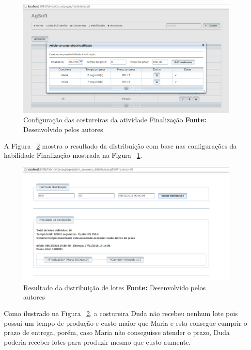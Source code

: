 \newpage

\begin{figure}[h!]
	\centerline{\includegraphics[scale=0.4]{./imagens/cofiguracao_habilidade_teste3.png}}
	\caption[Configuração das costureiras da atividade Finalização]
	{Configuração das costureiras da atividade Finalização \textbf{Fonte:} Desenvolvido pelos autores}
	\label{fig:configuracao_habilidade_costureira_teste3}
\end{figure}


\par A Figura ~\ref{fig:resultado1_teste3} mostra o resultado da distribuição
com base nas configurações da habilidade Finalização mostrada na Figura
~\ref{fig:configuracao_habilidade_costureira_teste3}.

\begin{figure}[h!]
	\centerline{\includegraphics[scale=0.4]{./imagens/resultado1_teste3.png}}
	\caption[Resultado da distribuição de lotes]
	{Resultado da distribuição de lotes \textbf{Fonte:} Desenvolvido pelos autores}
	\label{fig:resultado1_teste3}
\end{figure}

\par Como ilustrado na Figura ~\ref{fig:resultado1_teste3}, a costureira Duda
não recebeu nenhum lote pois possui um tempo de produção e custo maior que Maria e
esta consegue cumprir o prazo de entrega, porém, caso Maria não conseguisse atender
o prazo, Duda poderia receber lotes para produzir mesmo que custo aumente.

